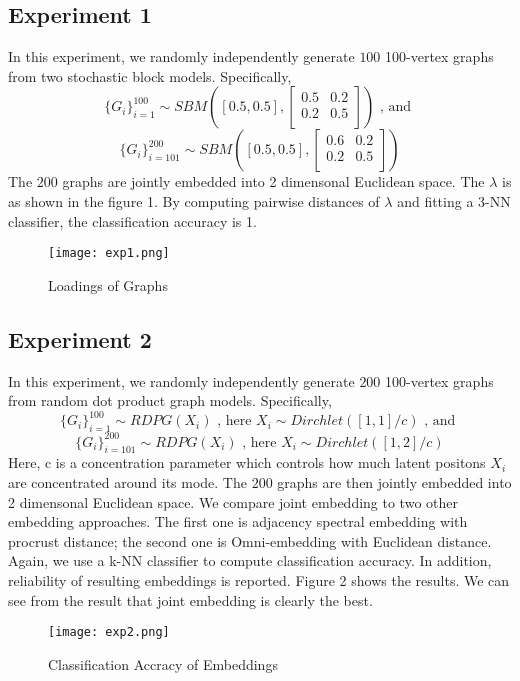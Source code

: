 \documentclass[a4paper]{article}
\begin{document}
\subsection{Experiment 1}
 In this experiment, we randomly independently generate $100$ 100-vertex graphs from two stochastic block models. Specifically,
 \[ \{G_i\}_{i=1}^{100} \sim  SBM([0.5, 0.5],\begin{bmatrix} 0.5 & 0.2 \\ 0.2 & 0.5 \\ \end{bmatrix}) \text{ , and } \]
  \[ \{G_i\}_{i=101}^{200} \sim  SBM([0.5, 0.5],\begin{bmatrix} 0.6 & 0.2 \\ 0.2 & 0.5 \\ \end{bmatrix})\]
  The $200$ graphs are jointly embedded into 2 dimensonal Euclidean space. The $\lambda$ is as shown in the figure 1. By computing pairwise distances of $\lambda$ and fitting a 3-NN classifier, the classification accuracy is 1.
\begin{figure}[p]
    \centering
    \texttt{[image: exp1.png]}
    \caption{Loadings of Graphs}
\end{figure}

\subsection{Experiment 2}
 In this experiment, we randomly independently generate $200$ 100-vertex graphs from random dot product graph models. Specifically,
 \[ \{G_i\}_{i=1}^{100} \sim  RDPG(X_i) \text{ , here } X_i \sim Dirchlet([1,1]/c) \text{ , and } \]
 \[ \{G_i\}_{i=101}^{200} \sim  RDPG(X_i) \text{ , here } X_i \sim Dirchlet([1,2]/c) \]
  Here, c is a concentration parameter which controls how much latent positons $X_i$ are concentrated around its mode. The $200$ graphs are then jointly embedded into 2 dimensonal Euclidean space. We compare joint embedding to two other embedding approaches. The first one is adjacency spectral embedding with procrust distance; the second one is Omni-embedding with Euclidean distance. Again, we use a k-NN  classifier to compute classification accuracy. In addition, reliability of resulting embeddings is reported. Figure 2 shows the results. We can see from the result that joint embedding is clearly the best. 
\begin{figure}[p]
    \centering
    \texttt{[image: exp2.png]}
    \caption{Classification Accracy of Embeddings}
\end{figure}
\end{document}
